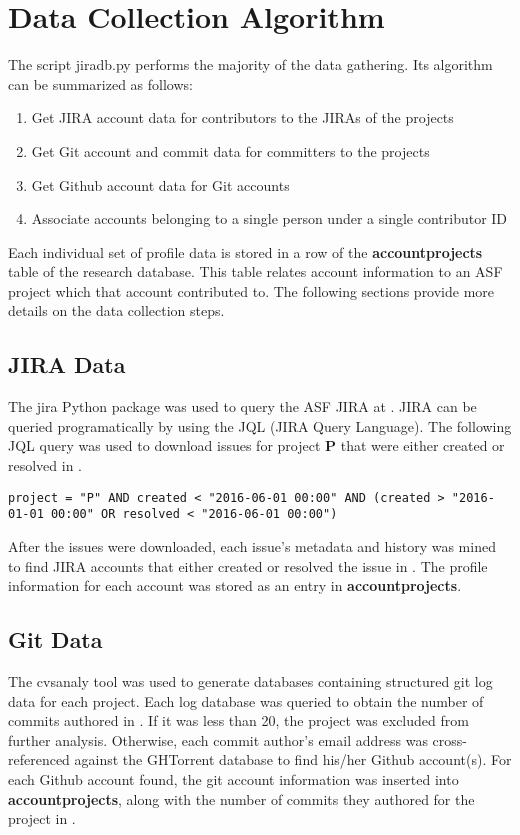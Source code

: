\section{Data Collection Algorithm}
The script jiradb.py performs the majority of the data gathering. Its algorithm can be summarized as follows:
\begin{enumerate}
	\item Get JIRA account data for contributors to the JIRAs of the projects
	\item Get Git account and commit data for committers to the projects
	\item Get Github account data for Git accounts
	\item Associate accounts belonging to a single person under a single contributor ID
\end{enumerate}
Each individual set of profile data is stored in a row of the \textbf{accountprojects} table of the research database. This table relates account information to an ASF project which that account contributed to. The following sections provide more details on the data collection steps.

\subsection{JIRA Data}
The jira Python package was used to query the ASF JIRA at \ASFJIRAURL. JIRA can be queried programatically by using the JQL (JIRA Query Language). The following JQL query was used to download issues for project \textbf{P} that were either created or resolved in \timeperiod.
\begin{verbatim}
project = "P" AND created < "2016-06-01 00:00" AND (created > "2016-01-01 00:00" OR resolved < "2016-06-01 00:00")
\end{verbatim}
After the issues were downloaded, each issue's metadata and history was mined to find JIRA accounts that either created or resolved the issue in \timeperiod. The profile information for each account was stored as an entry in \textbf{accountprojects}.
\subsection{Git Data}
The cvsanaly tool was used to generate databases containing structured git log data for each project. Each log database was queried to obtain the number of commits authored in \timeperiod. If it was less than 20, the project was excluded from further analysis. Otherwise, each commit author's email address was cross-referenced against the GHTorrent database to find his/her Github account(s). For each Github account found, the git account information was inserted into \textbf{accountprojects}, along with the number of commits they authored for the project in \timeperiod.

